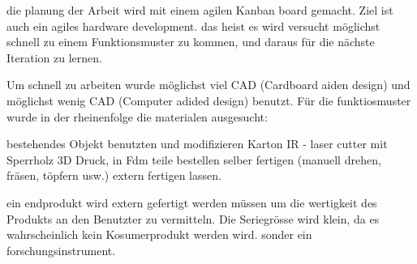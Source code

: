 die planung der Arbeit wird mit einem agilen Kanban board gemacht. Ziel ist auch ein agiles hardware development. das heist es wird versucht möglichst schnell zu einem Funktionsmuster zu kommen, und daraus für die nächste Iteration zu lernen.

Um schnell zu arbeiten wurde möglichst viel CAD (Cardboard aiden design) und möglichst wenig CAD (Computer adided design) benutzt. Für die funktiosmuster wurde in der rheinenfolge die materialen ausgesucht:

bestehendes Objekt benutzten und modifizieren
Karton
IR - laser cutter mit Sperrholz
3D Druck, in Fdm
teile bestellen
selber fertigen (manuell drehen, fräsen, töpfern usw.)
extern fertigen lassen.

ein endprodukt wird extern gefertigt werden müssen um die wertigkeit des Produkts an den Benutzter zu vermitteln. Die Seriegrösse wird klein, da es wahrscheinlich kein Kosumerprodukt werden wird. sonder ein forschungsinstrument.
